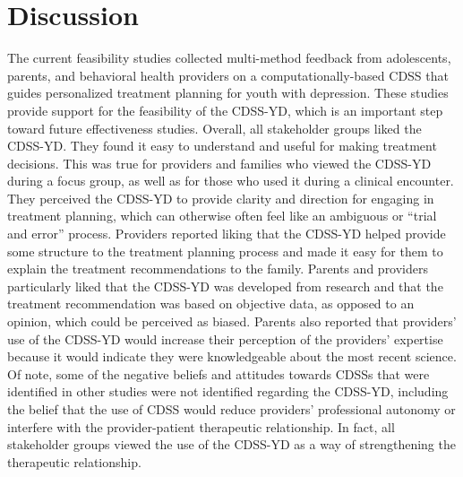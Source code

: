 \section{Discussion}
The current feasibility studies collected multi-method
feedback from adolescents, parents, and behavioral
health providers on a computationally-based CDSS
that guides personalized treatment planning for youth
with depression. These studies provide support for the feasibility of the CDSS-YD, which is an important step
toward future effectiveness studies. Overall, all stakeholder groups liked the CDSS-YD. They found it easy to
understand and useful for making treatment decisions.
This was true for providers and families who viewed the
CDSS-YD during a focus group, as well as for those who
used it during a clinical encounter. They perceived the
CDSS-YD to provide clarity and direction for engaging
in treatment planning, which can otherwise often feel
like an ambiguous or “trial and error” process. Providers
reported liking that the CDSS-YD helped provide some
structure to the treatment planning process and made it
easy for them to explain the treatment recommendations
to the family. Parents and providers particularly liked
that the CDSS-YD was developed from research and
that the treatment recommendation was based on objective data, as opposed to an opinion, which could be perceived as biased. Parents also reported that providers’ use
of the CDSS-YD would increase their perception of the
providers’ expertise because it would indicate they were
knowledgeable about the most recent science. Of note,
some of the negative beliefs and attitudes towards CDSSs
that were identified in other studies were not identified
regarding the CDSS-YD, including the belief that the use
of CDSS would reduce providers’ professional autonomy
or interfere with the provider-patient therapeutic relationship. In fact, all stakeholder groups viewed the use of
the CDSS-YD as a way of strengthening the therapeutic
relationship.
